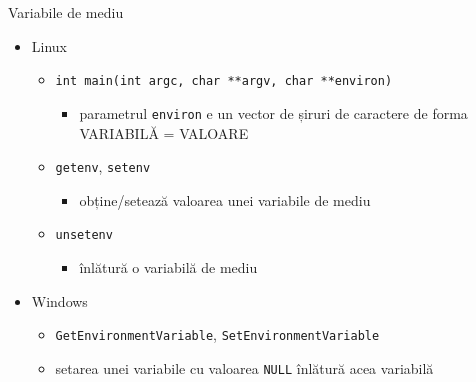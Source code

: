 \documentclass{so.cs.pub.ro}
\begin{document}
\begin{frame}{Variabile de mediu}
	\begin{itemize}
		\item Linux
		\begin{itemize}
			\item \texttt{int main(int argc, char **argv, char **environ)} 		
			\begin{itemize}
				\item parametrul \texttt{environ} e un vector de șiruri de caractere de forma VARIABILĂ = VALOARE
			\end{itemize}			
			\item \texttt{getenv}, \texttt{setenv}
			\begin{itemize}
				\item obține/setează valoarea unei variabile de mediu 			
			\end{itemize}
			\item \texttt{unsetenv}
			\begin{itemize}
				\item înlătură o variabilă de mediu 			
			\end{itemize}
		\end{itemize}
		\vspace*{0.1cm}
		\item Windows
			\begin{itemize}
				\item \texttt{GetEnvironmentVariable}, \texttt{SetEnvironmentVariable}			
				\item setarea unei variabile cu valoarea \texttt{NULL} înlătură acea variabilă
			\end{itemize}
	\end{itemize}
\end{frame}
\end{document}
